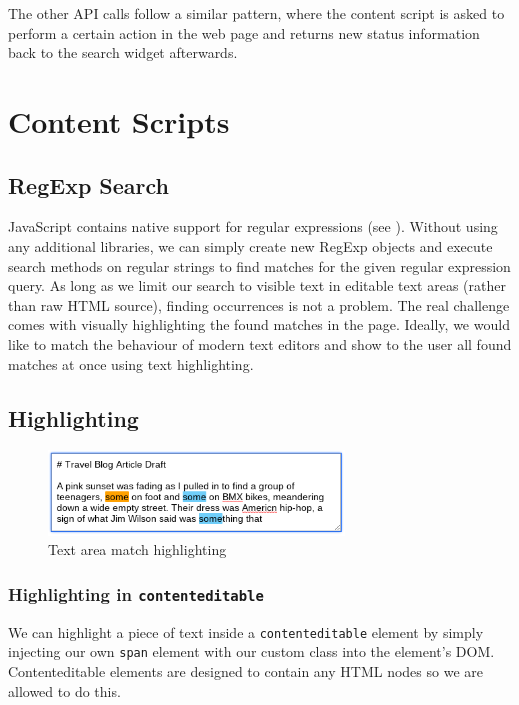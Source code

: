 \documentclass[bsc,frontabs,twoside,singlespacing,parskip,deptreport]{infthesis}
\begin{document}
The other API calls follow a similar pattern, where the content script is asked to perform a certain action in the web page and returns new status information back to the search widget afterwards.

\section{Content Scripts}
\subsection{RegExp Search}
JavaScript contains native support for regular expressions (see \cite{M8}). Without using any additional libraries, we can simply create new RegExp objects and execute search methods on regular strings to find matches for the given regular expression query. As long as we limit our search to visible text in editable text areas (rather than raw HTML source), finding occurrences is not a problem. The real challenge comes with visually highlighting the found matches in the page. Ideally, we would like to match the behaviour of modern text editors and show to the user all found matches at once using text highlighting.

\subsection{Highlighting}
\begin{figure}[h]
\centering
\includegraphics[width=0.7\textwidth]{../main/images/help/highlighting.png}
\caption{Text area match highlighting}
\end{figure}

\subsubsection{Highlighting in \texttt{contenteditable}}
We can highlight a piece of text inside a \texttt{contenteditable}
element by simply injecting our own \texttt{span} element with our
custom class into the element's DOM. Contenteditable elements are
designed to contain any HTML nodes so we are allowed to do this.
\end{document}
